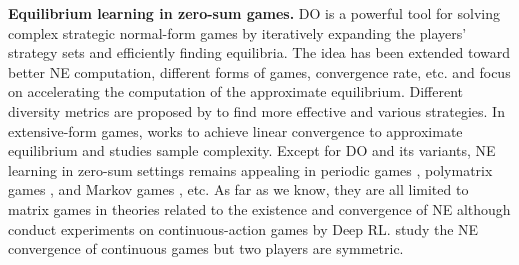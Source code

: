\textbf{Equilibrium learning in zero-sum games.} DO \citep{mcmahan2003planning} is a powerful tool for solving complex strategic normal-form games by iteratively expanding the players' strategy sets and efficiently finding equilibria. The idea has been extended toward better NE computation, different forms of games, convergence rate, etc. \citet{mcaleer2020pipeline} and \citet{zhou2023efficient} focus on accelerating the computation of the approximate equilibrium. Different diversity metrics are proposed by \citep{balduzzi2019open, perez2021modelling, liu2021towards, yao2024policy} to find more effective and various strategies. In extensive-form games, \citet{mcaleer2021xdo} works to achieve linear convergence to approximate equilibrium and \citet{tang2023regret} studies sample complexity. Except for DO and its variants, NE learning in zero-sum settings remains appealing in periodic games \citep{fiez2021online}, polymatrix games \citep{cai2016zero}, and Markov games \citep{zhu2020online}, etc. As far as we know, they are all limited to matrix games in theories related to the existence and convergence of NE although \citet{mcaleer2021xdo} conduct experiments on continuous-action games by Deep RL. \citet{balandat2016minimizing, Adam2021DOcontin} study the NE convergence of continuous games but two players are symmetric.


